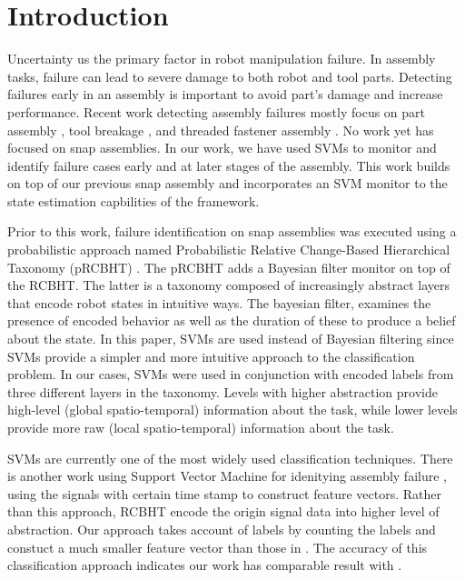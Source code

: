 %

\chapter{Introduction}

Uncertainty us the primary factor in robot manipulation failure. In assembly tasks, failure can lead to severe damage to both robot and tool parts. Detecting failures early in an assembly is important to avoid part's damage and increase performance. Recent work detecting assembly failures mostly focus on part assembly \cite{fullmer1989parts}, tool breakage \cite{cho2005tool} \cite{hsueh2008prediction}, and threaded fastener assembly \cite{althoefer2008automated}. No work yet has focused on snap assemblies. In our work, we have used SVMs to monitor and identify failure cases early and at later stages of the assembly. This work builds on top of our previous snap assembly \cite{2012JAR-Rojas-AutHetBotAsmbly} and incorporates an SVM monitor to the state estimation capbilities of the framework. 

\indent Prior to this work, failure identification on snap assemblies was executed using a probabilistic approach named Probabilistic Relative Change-Based Hierarchical Taxonomy (pRCBHT) \cite{2012Humanoids-Rojas-pRCBHT}. The pRCBHT adds a Bayesian filter monitor on top of the RCBHT. The latter is a taxonomy composed of increasingly abstract layers that encode robot states in intuitive ways. The bayesian filter, examines the presence of encoded behavior as well as the duration of these to produce a belief about the state. In this paper, SVMs are used instead of Bayesian filtering since SVMs provide a simpler and more intuitive approach to the classification problem. In our cases, SVMs were used in conjunction with encoded labels from three different layers in the taxonomy. Levels with higher abstraction provide high-level (global spatio-temporal) information about the task, while lower levels provide more raw (local spatio-temporal) information about the task.

\indent SVMs are currently one of the most widely used classification techniques. There is another work using Support Vector Machine for idenitying assembly failure \cite{masonfailure}, using the signals with certain time stamp to construct feature vectors. Rather than this approach, RCBHT encode the origin signal data into higher level of abstraction. Our approach takes account of labels by counting the labels and constuct a much smaller feature vector than those in \cite{masonfailure}. The accuracy of this classification approach indicates our work has comparable result with \cite{masonfailure}.

